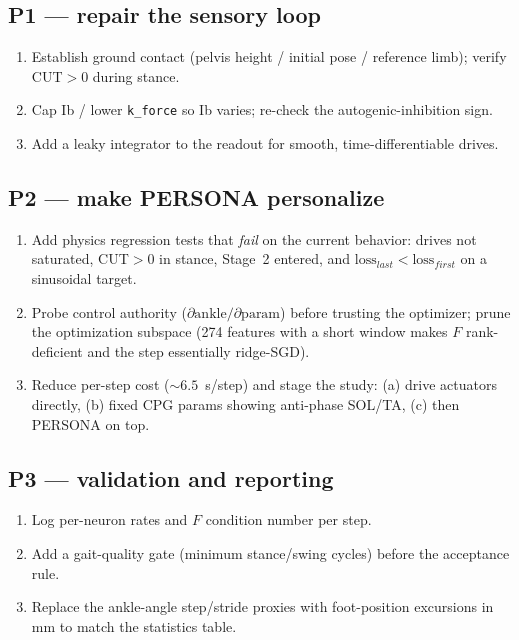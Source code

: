 \documentclass[11pt]{article}
\begin{document}
\subsection*{P1 --- repair the sensory loop}
\begin{enumerate}
  \item Establish ground contact (pelvis height / initial pose / reference
        limb); verify CUT$>0$ during stance.
  \item Cap Ib / lower \texttt{k\_force} so Ib varies; re-check the
        autogenic-inhibition sign.
  \item Add a leaky integrator to the readout for smooth, time-differentiable
        drives.
\end{enumerate}

\subsection*{P2 --- make PERSONA personalize}
\begin{enumerate}
  \item Add physics regression tests that \emph{fail} on the current behavior:
        drives not saturated, CUT$>0$ in stance, Stage~2 entered, and
        $\text{loss}_{last}<\text{loss}_{first}$ on a sinusoidal target.
  \item Probe control authority ($\partial\text{ankle}/\partial\text{param}$)
        before trusting the optimizer; prune the optimization subspace (274
        features with a short window makes $F$ rank-deficient and the step
        essentially ridge-SGD).
  \item Reduce per-step cost ($\sim\!6.5$~s/step) and stage the study:
        (a) drive actuators directly, (b) fixed CPG params showing anti-phase
        SOL/TA, (c) then PERSONA on top.
\end{enumerate}

\subsection*{P3 --- validation and reporting}
\begin{enumerate}
  \item Log per-neuron rates and $F$ condition number per step.
  \item Add a gait-quality gate (minimum stance/swing cycles) before the
        acceptance rule.
  \item Replace the ankle-angle step/stride proxies with foot-position
        excursions in mm to match the statistics table.
\end{enumerate}
\end{document}

